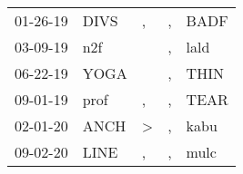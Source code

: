 \begin{supertabular}{p{0.07\textwidth}p{0.06\textwidth}p{0.02\textwidth}p{0.02\textwidth}p{0.06\textwidth}}
 01-26-19\textsuperscript{} &           DIVS\textsuperscript{} &                , &             , &           BADF\textsuperscript{} \\
 03-09-19\textsuperscript{} &            n2f\textsuperscript{} &                  &             , &           lald\textsuperscript{} \\
 06-22-19\textsuperscript{} &           YOGA\textsuperscript{} &                  &             , &           THIN\textsuperscript{} \\
 09-01-19\textsuperscript{} &           prof\textsuperscript{} &                , &             , &           TEAR\textsuperscript{} \\
 02-01-20\textsuperscript{} &           ANCH\textsuperscript{} &     \textgreater &             , &           kabu\textsuperscript{} \\
 09-02-20\textsuperscript{} &           LINE\textsuperscript{} &                , &             , &           mulc\textsuperscript{} \\
\end{supertabular}
